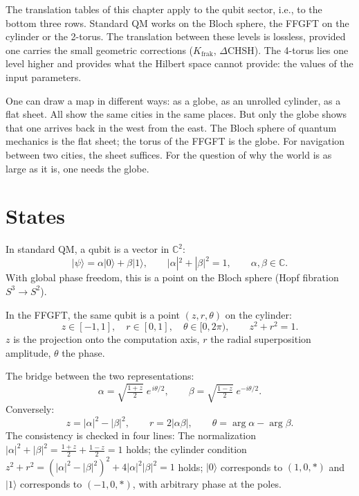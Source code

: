 The translation tables of this chapter apply to the qubit sector,
i.e., to the bottom three rows. Standard QM works on the
Bloch sphere, the FFGFT on the cylinder or the 2-torus. The
translation between these levels is lossless, provided one carries the
small geometric corrections ($K_{\mathrm{frak}}$, $\Delta$CHSH).
The 4-torus lies one level higher and provides what the
Hilbert space cannot provide: the values of the input parameters.

\begin{laierspur}
One can draw a map in different ways: as a globe,
as an unrolled cylinder, as a flat sheet. All show the same
cities in the same places. But only the globe shows that one
arrives back in the west from the east. The Bloch sphere of
quantum mechanics is the flat sheet; the torus of the FFGFT is the globe.
For navigation between two cities, the sheet suffices. For the
question of why the world is as large as it is, one needs the globe.
\end{laierspur}

\section{States}

In standard QM, a qubit is a vector in $\mathbb{C}^2$:
\begin{equation}
  |\psi\rangle = \alpha|0\rangle + \beta|1\rangle,\qquad
  |\alpha|^2+|\beta|^2 = 1,\qquad \alpha,\beta\in\mathbb{C}.
\end{equation}
With global phase freedom, this is a point on the Bloch sphere
(Hopf fibration $S^3\to S^2$).

In the FFGFT, the same qubit is a point $(z,r,\theta)$ on the
cylinder:
\begin{equation}
  z\in[-1,1],\quad r\in[0,1],\quad \theta\in[0,2\pi),\qquad z^2+r^2 = 1.
\end{equation}
$z$ is the projection onto the computation axis, $r$ the radial
superposition amplitude, $\theta$ the phase.

The bridge between the two representations:
\begin{equation}
  \boxed{\;
  \alpha = \sqrt{\tfrac{1+z}{2}}\;e^{\,i\theta/2},\qquad
  \beta = \sqrt{\tfrac{1-z}{2}}\;e^{-i\theta/2}.\;}
  \label{eq:state-bridge}
\end{equation}
Conversely:
\begin{equation}
  z = |\alpha|^2-|\beta|^2,\qquad
  r = 2|\alpha\beta|,\qquad
  \theta = \arg\alpha-\arg\beta.
\end{equation}
The consistency is checked in four lines: The normalization
$|\alpha|^2+|\beta|^2 = \frac{1+z}{2}+\frac{1-z}{2} = 1$ holds; the
cylinder condition $z^2+r^2 = (|\alpha|^2-|\beta|^2)^2+4|\alpha|^2|\beta|^2 = 1$
holds; $|0\rangle$ corresponds to $(1,0,\ast)$ and $|1\rangle$ corresponds to
$(-1,0,\ast)$, with arbitrary phase at the poles.


